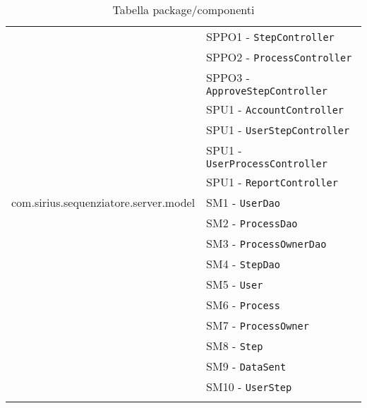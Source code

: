 \begin{longtable}{XX}
\sProcessOwner{}&SPPO1 - \texttt{StepController}\\
&SPPO2 - \texttt{ProcessController}\\
&SPPO3 - \texttt{ApproveStepController}\\
\midrule
\sUser{}&SPU1 - \texttt{AccountController}\\
&SPU1 - \texttt{UserStepController}\\
&SPU1 - \texttt{UserProcessController}\\
&SPU1 - \texttt{ReportController}\\
\midrule

com.sirius.sequenziatore.server.model
&SM1 - \texttt{UserDao}\\
&SM2 - \texttt{ProcessDao}\\
&SM3 - \texttt{ProcessOwnerDao}\\
&SM4 - \texttt{StepDao}\\
&SM5 - \texttt{User}\\
&SM6 - \texttt{Process}\\
&SM7 - \texttt{ProcessOwner}\\
&SM8 - \texttt{Step}\\
&SM9 - \texttt{DataSent}\\
&SM10 - \texttt{UserStep}\\
\midrule

\bottomrule
\caption{Tabella package/componenti}
\end{longtable}
